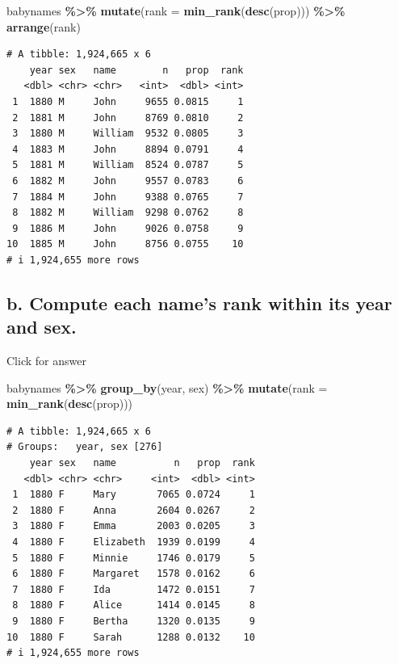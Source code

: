 \documentclass[
]{book}
\newenvironment{Shaded}{\begin{snugshade}}{\end{snugshade}}
\newcommand{\AttributeTok}[1]{\textcolor[rgb]{0.13,0.29,0.53}{#1}}
\newcommand{\FunctionTok}[1]{\textcolor[rgb]{0.13,0.29,0.53}{\textbf{#1}}}
\newcommand{\NormalTok}[1]{#1}
\newcommand{\SpecialCharTok}[1]{\textcolor[rgb]{0.81,0.36,0.00}{\textbf{#1}}}
\begin{document}
\begin{Shaded}
\begin{Highlighting}[]
\NormalTok{babynames }\SpecialCharTok{\%\textgreater{}\%} \FunctionTok{mutate}\NormalTok{(}\AttributeTok{rank =} \FunctionTok{min\_rank}\NormalTok{(}\FunctionTok{desc}\NormalTok{(prop))) }\SpecialCharTok{\%\textgreater{}\%} \FunctionTok{arrange}\NormalTok{(rank)}
\end{Highlighting}
\end{Shaded}

\begin{verbatim}
# A tibble: 1,924,665 x 6
    year sex   name        n   prop  rank
   <dbl> <chr> <chr>   <int>  <dbl> <int>
 1  1880 M     John     9655 0.0815     1
 2  1881 M     John     8769 0.0810     2
 3  1880 M     William  9532 0.0805     3
 4  1883 M     John     8894 0.0791     4
 5  1881 M     William  8524 0.0787     5
 6  1882 M     John     9557 0.0783     6
 7  1884 M     John     9388 0.0765     7
 8  1882 M     William  9298 0.0762     8
 9  1886 M     John     9026 0.0758     9
10  1885 M     John     8756 0.0755    10
# i 1,924,655 more rows
\end{verbatim}

\hypertarget{b.-compute-each-names-rank-within-its-year-and-sex.}{%
\subsection{b. Compute each name's rank within its year and sex.}\label{b.-compute-each-names-rank-within-its-year-and-sex.}}

Click for answer

\begin{Shaded}
\begin{Highlighting}[]
\NormalTok{babynames }\SpecialCharTok{\%\textgreater{}\%} \FunctionTok{group\_by}\NormalTok{(year, sex) }\SpecialCharTok{\%\textgreater{}\%} \FunctionTok{mutate}\NormalTok{(}\AttributeTok{rank =} \FunctionTok{min\_rank}\NormalTok{(}\FunctionTok{desc}\NormalTok{(prop)))}
\end{Highlighting}
\end{Shaded}

\begin{verbatim}
# A tibble: 1,924,665 x 6
# Groups:   year, sex [276]
    year sex   name          n   prop  rank
   <dbl> <chr> <chr>     <int>  <dbl> <int>
 1  1880 F     Mary       7065 0.0724     1
 2  1880 F     Anna       2604 0.0267     2
 3  1880 F     Emma       2003 0.0205     3
 4  1880 F     Elizabeth  1939 0.0199     4
 5  1880 F     Minnie     1746 0.0179     5
 6  1880 F     Margaret   1578 0.0162     6
 7  1880 F     Ida        1472 0.0151     7
 8  1880 F     Alice      1414 0.0145     8
 9  1880 F     Bertha     1320 0.0135     9
10  1880 F     Sarah      1288 0.0132    10
# i 1,924,655 more rows
\end{verbatim}
\end{document}
